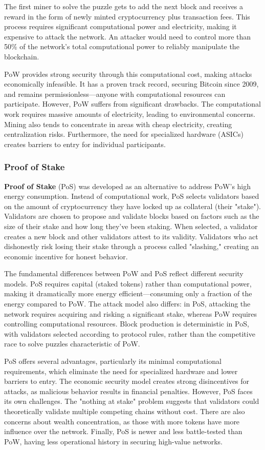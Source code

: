 The first miner to solve the puzzle gets to add the next block and receives a reward in the form of newly minted cryptocurrency plus transaction fees. This process requires significant computational power and electricity, making it expensive to attack the network. An attacker would need to control more than 50\% of the network's total computational power to reliably manipulate the blockchain.

PoW provides strong security through this computational cost, making attacks economically infeasible. It has a proven track record, securing Bitcoin since 2009, and remains permissionless—anyone with computational resources can participate. However, PoW suffers from significant drawbacks. The computational work requires massive amounts of electricity, leading to environmental concerns. Mining also tends to concentrate in areas with cheap electricity, creating centralization risks. Furthermore, the need for specialized hardware (ASICs) creates barriers to entry for individual participants.

\subsubsection{Proof of Stake}
\textbf{Proof of Stake} (PoS) was developed as an alternative to address PoW's high energy consumption. Instead of computational work, PoS selects validators based on the amount of cryptocurrency they have locked up as collateral (their "stake"). Validators are chosen to propose and validate blocks based on factors such as the size of their stake and how long they've been staking. When selected, a validator creates a new block and other validators attest to its validity. Validators who act dishonestly risk losing their stake through a process called "slashing," creating an economic incentive for honest behavior.

The fundamental differences between PoW and PoS reflect different security models. PoS requires capital (staked tokens) rather than computational power, making it dramatically more energy efficient—consuming only a fraction of the energy compared to PoW. The attack model also differs: in PoS, attacking the network requires acquiring and risking a significant stake, whereas PoW requires controlling computational resources. Block production is deterministic in PoS, with validators selected according to protocol rules, rather than the competitive race to solve puzzles characteristic of PoW.

PoS offers several advantages, particularly its minimal computational requirements, which eliminate the need for specialized hardware and lower barriers to entry. The economic security model creates strong disincentives for attacks, as malicious behavior results in financial penalties. However, PoS faces its own challenges. The "nothing at stake" problem suggests that validators could theoretically validate multiple competing chains without cost. There are also concerns about wealth concentration, as those with more tokens have more influence over the network. Finally, PoS is newer and less battle-tested than PoW, having less operational history in securing high-value networks.

